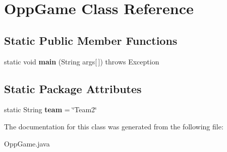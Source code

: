 \hypertarget{classOppGame}{
\section{OppGame Class Reference}
\label{classOppGame}
}
\subsection*{Static Public Member Functions}
\begin{DoxyCompactItemize}
\item 
\hypertarget{classOppGame_a83bcb37b498270c34f03185f9e99dac7}{
static void {\bfseries main} (String args\mbox{[}$\,$\mbox{]})  throws Exception 	}
\label{classOppGame_a83bcb37b498270c34f03185f9e99dac7}

\end{DoxyCompactItemize}
\subsection*{Static Package Attributes}
\begin{DoxyCompactItemize}
\item 
\hypertarget{classOppGame_a910e96f0afb84a2823f2c1fd29d6f5dd}{
static String {\bfseries team} = \char`\"{}Team2\char`\"{}}
\label{classOppGame_a910e96f0afb84a2823f2c1fd29d6f5dd}

\end{DoxyCompactItemize}


The documentation for this class was generated from the following file:\begin{DoxyCompactItemize}
\item 
OppGame.java\end{DoxyCompactItemize}

